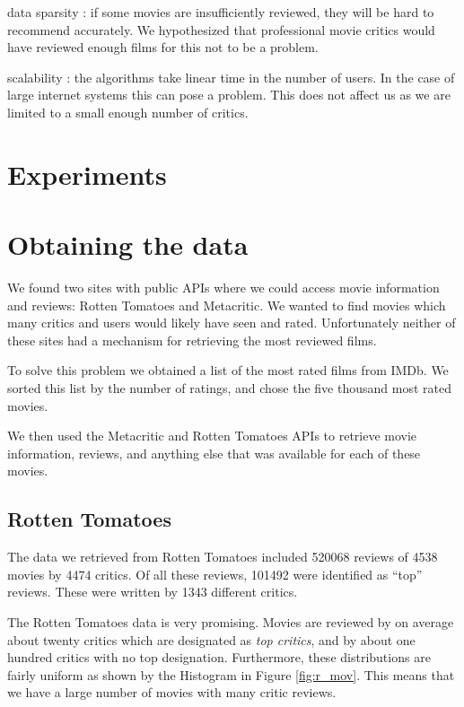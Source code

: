 \documentclass[12pt]{article}
\begin{document}
data sparsity : if some movies are insufficiently reviewed, they will be hard to recommend accurately. 
We hypothesized that professional movie critics would have reviewed enough films for this not to be a problem.

scalability : the algorithms take linear time in the number of users. In the case of large internet systems this can pose a problem.
This does not affect us as we are limited to a small enough number of critics.



\section{Experiments}

\section{Obtaining the data}

	We found two sites with public APIs where we could access movie information and reviews: Rotten Tomatoes and Metacritic. We wanted to find movies which many critics and users would likely have seen and rated. Unfortunately neither of these sites had a mechanism for retrieving the most reviewed films. 

	To solve this problem we obtained a list of the most rated films from IMDb. We sorted this list by the number of ratings, and chose the five thousand most rated movies. 

	We then used the Metacritic and Rotten Tomatoes APIs to retrieve movie information, reviews, and anything else that was available for each of these movies.

\subsection{Rotten Tomatoes}

	The data we retrieved from Rotten Tomatoes included 520068 reviews of 4538 movies by 4474 critics. Of all these reviews, 101492 were identified as ``top'' reviews. These were written by 1343 different critics.

	The Rotten Tomatoes data is very promising. Movies are reviewed by on average about twenty critics which are designated as \textit{top critics}, and by about one hundred critics with no top designation. Furthermore, these distributions are fairly uniform as shown by the Histogram in Figure \ref{fig:r_mov}. This means that we have a large number of movies with many critic reviews.
\end{document}
